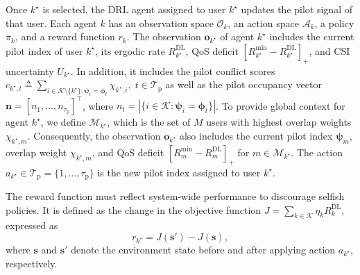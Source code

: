 \documentclass[10pt, conference]{IEEEtran}
\begin{document}
Once $k^\star$ is selected, the DRL agent assigned to user $k^\star$ updates the pilot signal of that user.
Each agent $k$ has an observation space $\mathcal{O}_k$, an action space $\mathcal{A}_k$, a policy $\pi_k$, and a reward function $r_k$.
The observation $\mathbf{o}_{k^\star}$ of agent $k^\star$ includes the current pilot index of user $k^\star$, its ergodic rate $R_{k^\star}^{\textrm{DL}}$, QoS deficit $\left[R_{k^\star}^{\min} - R_{k^\star}^{\textrm{DL}}\right]_+$, and CSI uncertainty $U_{k^\star}$. 
In addition, it includes the pilot conflict scores $c_{k^\star, t} \triangleq \sum_{i \in \mathcal{K} \setminus \{k^\star\} : \boldsymbol{\psi}_i = \boldsymbol{\phi}_t} \chi_{k^\star, i},\; t \in \mathcal{T}_\mathrm{p}$ as well as the pilot occupancy vector $\mathbf{n} = [n_1, \ldots, n_{\tau_\mathrm{p}}]^\top$, where $n_t = \left|\{i \in \mathcal{K} : \boldsymbol{\psi}_i = \boldsymbol{\phi}_t\}\right|$. 
To provide global context for agent $k^\star$, we define $\mathcal{M}_{k^\star}$, which is the set of $M$ users with highest overlap weights $\chi_{k^\star,m}$. Consequently, the observation $\mathbf{o}_{k^\star}$ also includes the current pilot index $\boldsymbol{\psi}_m$, overlap weight $\chi_{k^\star,m}$, and QoS deficit $\left[R_{m}^{\min} - R_{m}^{\textrm{DL}}\right]_+$ for $m \in \mathcal{M}_{k^\star}$.
The action $a_{k^\star} \in \mathcal{T}_\mathrm{p} = \{1, \ldots, \tau_\mathrm{p}\}$ is the new pilot index assigned to user $k^\star$. 

The reward function must reflect system-wide performance to discourage selfish policies. It is defined as the change in the objective function $J=\sum_{k\in\mathcal{K}} \eta_k R_k^{\mathrm{DL}}$, expressed as
\begin{equation}\label{eq:reward}
    r_{k^\star} = J\left(\mathbf{s}'\right) - J(\mathbf{s}),
\end{equation}
where $\mathbf{s}$ and $\mathbf{s}'$ denote the environment state before and after applying action $a_{k^\star}$, respectively.
\end{document}
